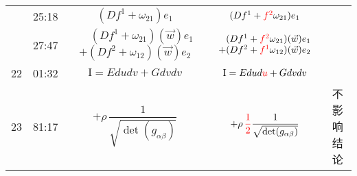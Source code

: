 \documentclass{article}
\begin{document}
\begin{center}
\begin{longtable}{|c|c|c|c|c|}
		 & 25:18 & $(Df^1+\omega_{21})e_1$ & $(Df^1+\textcolor{red}{f^{2}}\omega_{21})e_1$ & \\
		\cline{2-5}
		& 27:47 &
		 \makecell[c]{$\phantom{+}(Df^1+\omega_{21})(\vec{w})e_1$\\$+(Df^2+\omega_{12})(\vec{w})e_2$} & \makecell[c]{$\phantom{+}(Df^1+\textcolor{red}{f^{2}}\omega_{21})(\vec{w})e_1$\\$+(Df^2+\textcolor{red}{f^{1}}\omega_{12})(\vec{w})e_2$} & \\
		\hline
		22 & 01:32 & $\mathrm{I}=Edudv+Gdvdv$ & $\mathrm{I}=Edud{\textcolor{red}{u}}+Gdvdv$ & \\
		\hline
		23 & 81:17 & $+\rho\,\dfrac{1}{\sqrt{\det(g_{\alpha\beta})}}$ & $+\rho\,{\textcolor{red}{\dfrac{1}{2}}}\dfrac{1}{\sqrt{\det(g_{\alpha\beta})}}$ & 不影响结论 \\
		\hline
	\end{longtable}
\end{center}
\end{document}
